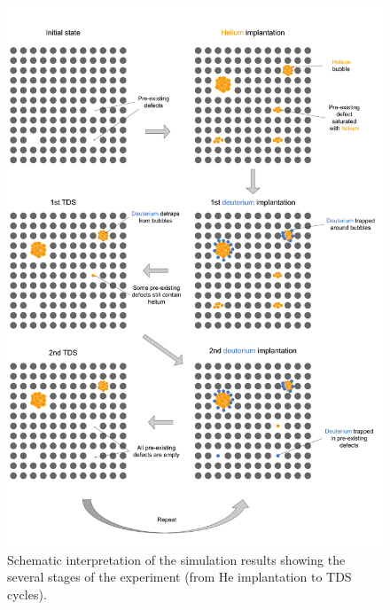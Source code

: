 \begin{figure}
    \centering
    \includegraphics[width=\linewidth]{Figures/Chapter5/sketch ialovega experiment.pdf}
    \caption{Schematic interpretation of the simulation results showing the several stages of the experiment (from \gls{He} implantation to TDS cycles).}
\end{figure}
